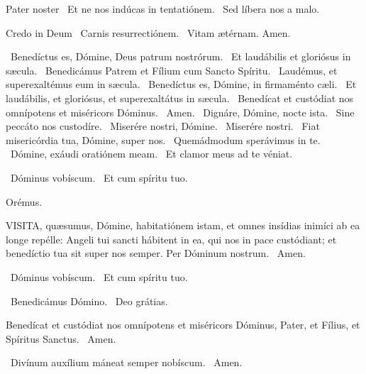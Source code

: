 Pater noster  \V\ Et ne nos indúcas in tentatiónem. \R\ Sed líbera nos a malo.

Credo in Deum  \V\ Carnis resurrectiónem. \R\ Vitam ætérnam. Amen.

\V\ Benedíctus es, Dómine, Deus patrum nostrórum. \R\ Et laudábilis et gloriósus in sæcula. \V\ Benedicámus Patrem et Fílium cum Sancto Spíritu. \R\ Laudémus, et superexaltémus eum in sæcula. \V\ Benedíctus es, Dómine, in firmaménto cæli. \R\ Et laudábilis, et gloriósus, et superexaltátus in sæcula. \V\ Benedícat et custódiat nos omnípotens et miséricors Dóminus. \R\ Amen. \V\ Dignáre, Dómine, nocte ista. \R\ Sine peccáto nos custodíre. \V\ Miserére nostri, Dómine. \R\ Miserére nostri. \V\ Fiat misericórdia tua, Dómine, super nos. \R\ Quemádmodum sperávimus in te. \V\ Dómine, exáudi oratiónem meam. \R\ Et clamor meus ad te véniat.


\V\ Dóminus vobíscum. \R\ Et cum spíritu tuo.

Orémus. 

\lettrine[lines=2]{V}{ISITA}, quæsumus, Dómine, habitatiónem istam, et omnes insídias inimíci ab ea longe repélle: Angeli tui sancti hábitent in ea, qui nos in pace custódiant; et benedíctio tua sit super nos semper. Per Dóminum nostrum. \R\ Amen.


\V\ Dóminus vobíscum. \R\ Et cum spíritu tuo.

\V\ Benedicámus Dómino. \R\ Deo grátias.

 Benedícat et custódiat nos omnípotens et miséricors Dóminus, Pater, et Fílius, et Spíritus Sanctus. \R\ Amen.



\V\ Divínum auxílium máneat semper nobíscum. \R\ Amen.



